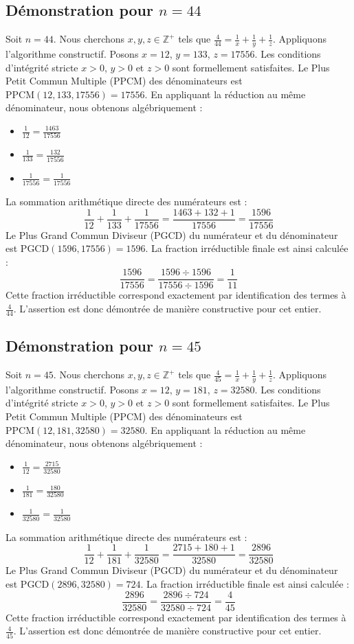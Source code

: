 \documentclass[11pt,a4paper]{article}
\begin{document}
\subsection{Démonstration pour $n = 44$}
Soit $n = 44$. Nous cherchons $x, y, z \in \mathbb{Z}^{+}$ tels que $\frac{4}{44} = \frac{1}{x} + \frac{1}{y} + \frac{1}{z}$.
Appliquons l'algorithme constructif. Posons $x = 12$, $y = 133$, $z = 17556$.
Les conditions d'intégrité stricte $x > 0$, $y > 0$ et $z > 0$ sont formellement satisfaites.
Le Plus Petit Commun Multiple (PPCM) des dénominateurs est $\text{PPCM}(12, 133, 17556) = 17556$.
En appliquant la réduction au même dénominateur, nous obtenons algébriquement :
\begin{itemize}
    \item $\frac{1}{12} = \frac{1463}{17556}$
    \item $\frac{1}{133} = \frac{132}{17556}$
    \item $\frac{1}{17556} = \frac{1}{17556}$
\end{itemize}
La sommation arithmétique directe des numérateurs est :
$$ \frac{1}{12} + \frac{1}{133} + \frac{1}{17556} = \frac{1463 + 132 + 1}{17556} = \frac{1596}{17556} $$
Le Plus Grand Commun Diviseur (PGCD) du numérateur et du dénominateur est $\text{PGCD}(1596, 17556) = 1596$.
La fraction irréductible finale est ainsi calculée :
$$ \frac{1596}{17556} = \frac{1596 \div 1596}{17556 \div 1596} = \frac{1}{11} $$
Cette fraction irréductible correspond exactement par identification des termes à $\frac{4}{44}$. L'assertion est donc démontrée de manière constructive pour cet entier.

\subsection{Démonstration pour $n = 45$}
Soit $n = 45$. Nous cherchons $x, y, z \in \mathbb{Z}^{+}$ tels que $\frac{4}{45} = \frac{1}{x} + \frac{1}{y} + \frac{1}{z}$.
Appliquons l'algorithme constructif. Posons $x = 12$, $y = 181$, $z = 32580$.
Les conditions d'intégrité stricte $x > 0$, $y > 0$ et $z > 0$ sont formellement satisfaites.
Le Plus Petit Commun Multiple (PPCM) des dénominateurs est $\text{PPCM}(12, 181, 32580) = 32580$.
En appliquant la réduction au même dénominateur, nous obtenons algébriquement :
\begin{itemize}
    \item $\frac{1}{12} = \frac{2715}{32580}$
    \item $\frac{1}{181} = \frac{180}{32580}$
    \item $\frac{1}{32580} = \frac{1}{32580}$
\end{itemize}
La sommation arithmétique directe des numérateurs est :
$$ \frac{1}{12} + \frac{1}{181} + \frac{1}{32580} = \frac{2715 + 180 + 1}{32580} = \frac{2896}{32580} $$
Le Plus Grand Commun Diviseur (PGCD) du numérateur et du dénominateur est $\text{PGCD}(2896, 32580) = 724$.
La fraction irréductible finale est ainsi calculée :
$$ \frac{2896}{32580} = \frac{2896 \div 724}{32580 \div 724} = \frac{4}{45} $$
Cette fraction irréductible correspond exactement par identification des termes à $\frac{4}{45}$. L'assertion est donc démontrée de manière constructive pour cet entier.
\end{document}
